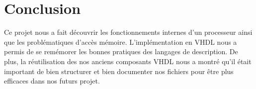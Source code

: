 \documentclass{article}
\begin{document}
    \section{Conclusion}
    \par Ce projet nous a fait découvrir les fonctionnements internes d'un processeur ainsi que les problématiques d'accès mémoire. L'implémentation en VHDL nous a permis de se remémorer les bonnes pratiques des langages de description. De plus, la réutilisation des nos anciens composants VHDL nous a montré qu'il était important de bien structurer et bien documenter nos fichiers pour être plus efficaces dans nos futurs projet.

\end{document}
